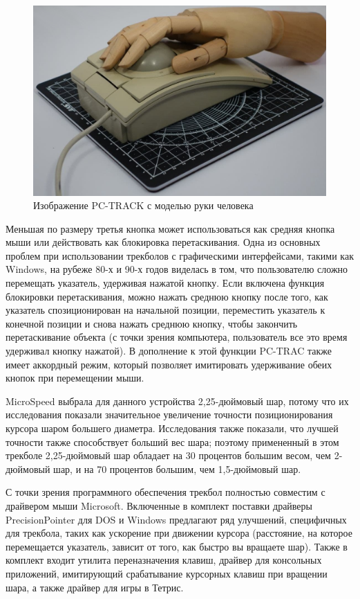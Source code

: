 \documentclass[11pt, a4paper]{article}
\begin{document}
\begin{figure}[h]
    \centering
    \includegraphics[scale=0.3]{1991_microspeed_pc-track/PC1.jpg}
    \caption{Изображение PC-TRACK с моделью руки человека}
    \label{fig:PCTRACKHand}
\end{figure}

Меньшая по размеру третья кнопка может использоваться как средняя кнопка мыши или действовать как блокировка перетаскивания. Одна из основных проблем при использовании трекболов с графическими интерфейсами, такими как Windows, на рубеже 80-х и 90-х годов виделась в том, что пользователю сложно перемещать указатель, удерживая нажатой кнопку. Если включена функция блокировки перетаскивания, можно нажать среднюю кнопку после того, как указатель спозиционирован на начальной позиции, переместить указатель к конечной позиции и снова нажать среднюю кнопку, чтобы закончить перетаскивание объекта (с точки зрения компьютера, пользователь все это время удерживал кнопку нажатой). В дополнение к этой функции PC-TRAC также имеет аккордный режим, который позволяет имитировать удерживание обеих кнопок при перемещении мыши.

MicroSpeed выбрала для данного устройства 2,25-дюймовый шар, потому что их исследования показали значительное увеличение точности позиционирования курсора шаром большего диаметра. Исследования также показали, что лучшей точности также способствует больший вес шара; поэтому примененный в этом трекболе 2,25-дюймовый шар обладает на 30 процентов большим весом, чем 2-дюймовый шар, и на 70 процентов большим, чем 1,5-дюймовый шар.

С точки зрения программного обеспечения трекбол полностью совместим с драйвером мыши Microsoft. Включенные в комплект поставки драйверы PrecisionPointer для DOS и Windows предлагают ряд улучшений, специфичных для трекбола, таких как ускорение при движении курсора (расстояние, на которое перемещается указатель, зависит от того, как быстро вы вращаете шар). Также в комплект входит утилита переназначения клавиш, драйвер для консольных приложений, имитирующий срабатывание курсорных клавиш при вращении шара, а также драйвер для игры в Тетрис.
\end{document}
